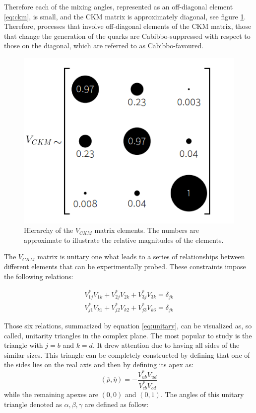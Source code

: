  Therefore each of the mixing angles, represented as an off-diagonal element \ref{eq:ckm}, is small, and the CKM matrix is approximately diagonal, see figure \ref{fig:ckm_magnitudes}. Therefore, processes that involve off-diagonal elements of the CKM matrix, those that change the generation of the quarks are Cabibbo-suppressed with respect to those on the diagonal, which are referred to as Cabibbo-favoured.

\begin{figure}[h]
\centering
\includegraphics[scale=0.5]{figures/ckm_structure.PNG}
\caption{Hierarchy of the $V_{CKM}$ matrix elements. The numbers are approximate to illustrate the relative magnitudes of the elements.  
\label{fig:ckm_magnitudes}}
\end{figure}

 The $V_{CKM}$ matrix is unitary one what leads to a series of relationships between different elements that can be experimentally probed. These constraints impose the following relations:

\begin{equation}
\label{eq:unitary}
\begin{split}
        V_{1j}^{*}V_{1k} +  V_{2j}^{*}V_{2k} +  V_{3j}^{*}V_{3k} = \delta_{jk} \\
        V_{j1}^{*}V_{k1} +  V_{j2}^{*}V_{k2} +  V_{j3}^{*}V_{k3} = \delta_{jk} 
\end{split}
\end{equation}

Those six relations, summarized by equation \ref{eq:unitary}, can be visualized as, so called, unitarity triangles in the complex plane. The most popular to study is the triangle with  $j=b$ and $k=d$. It drew attention due to having all sides of the similar sizes. This triangle can be completely constructed by defining that one of the sides lies on the real axis and then by defining its apex as:
\begin{equation}
   (\overline{\rho}, \overline{\eta}) =- \frac{V_{ub}^{*}V_{ud}}{V_{cb}^{*}V_{cd}}
\end{equation}
while the remaining apexes are $(0,0)$ and $(0,1)$.  
The angles of this unitary triangle denoted as $\alpha, \beta, \gamma$ are defined as follow: 

